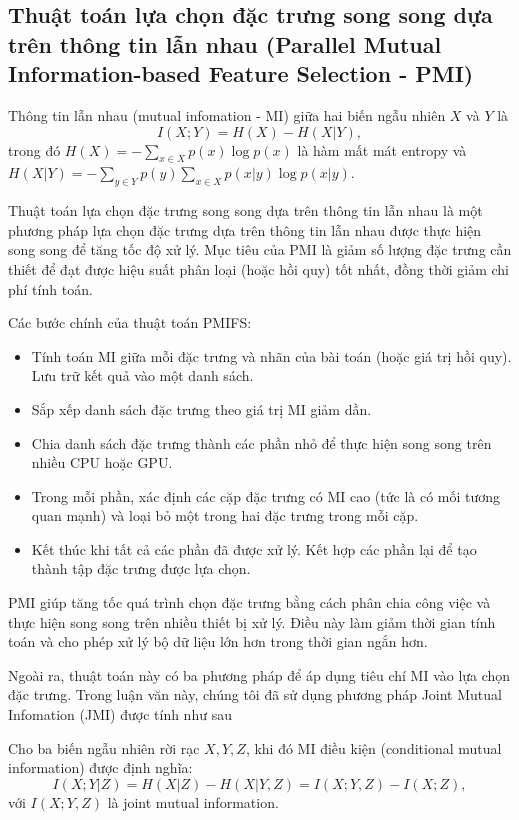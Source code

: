\subsection[PMI]{Thuật toán lựa chọn đặc trưng song song dựa trên thông tin lẫn nhau (Parallel Mutual Information-based Feature Selection - PMI) \cite{bennasar2015feature}}
\begin{definition}
	Thông tin lẫn nhau (mutual infomation - MI) giữa hai biến ngẫu nhiên $X$ và $Y$ là $$I(X; Y) = H(X) - H(X|Y),$$ trong đó $H(X) = -\sum_{x\in X}p(x)\log p(x)$ là hàm mất mát entropy và $H(X|Y) = -\sum_{y\in Y}p(y)\sum_{x\in X}p(x|y)\log p(x|y)$.
\end{definition}
Thuật toán lựa chọn đặc trưng song song dựa trên thông tin lẫn nhau là một phương pháp lựa chọn đặc trưng dựa trên thông tin lẫn nhau được thực hiện song song để tăng tốc độ xử lý. Mục tiêu của PMI là giảm số lượng đặc trưng cần thiết để đạt được hiệu suất phân loại (hoặc hồi quy) tốt nhất, đồng thời giảm chi phí tính toán.

Các bước chính của thuật toán PMIFS:
\begin{itemize}
	\item Tính toán MI giữa mỗi đặc trưng và nhãn của bài toán (hoặc giá trị hồi quy). Lưu trữ kết quả vào một danh sách.
	\item Sắp xếp danh sách đặc trưng theo giá trị MI giảm dần.
	\item Chia danh sách đặc trưng thành các phần nhỏ để thực hiện song song trên nhiều CPU hoặc GPU.
	\item Trong mỗi phần, xác định các cặp đặc trưng có MI cao (tức là có mối tương quan mạnh) và loại bỏ một trong hai đặc trưng trong mỗi cặp.
	\item Kết thúc khi tất cả các phần đã được xử lý. Kết hợp các phần lại để tạo thành tập đặc trưng được lựa chọn.
\end{itemize}

PMI giúp tăng tốc quá trình chọn đặc trưng bằng cách phân chia công việc và thực hiện song song trên nhiều thiết bị xử lý. Điều này làm giảm thời gian tính toán và cho phép xử lý bộ dữ liệu lớn hơn trong thời gian ngắn hơn.

Ngoài ra, thuật toán này có ba phương pháp để áp dụng tiêu chí MI vào lựa chọn đặc trưng. Trong luận văn này, chúng tôi đã sử dụng phương pháp Joint Mutual Infomation (JMI) được tính như sau
\begin{definition}
	Cho ba biến ngẫu nhiên rời rạc $X, Y, Z$, khi đó MI điều kiện (conditional mutual information) được định nghĩa:
	$$I(X;Y|Z) = H(X|Z) - H(X|Y, Z) = I(X;Y,Z) - I(X;Z),$$ với $I(X;Y,Z)$ là joint mutual information.
\end{definition}
